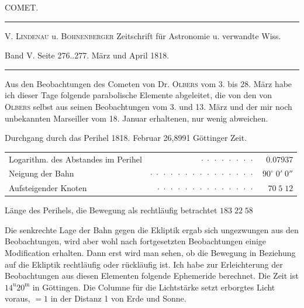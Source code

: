 \clearpage{}\hypertarget{native-407-part-lower}{}\label{native-407-part-lower}
\begin{center}\large COMET.\end{center}
\begin{center}\hrule\vspace{4pt}\fontsize{10}{12}\selectfont V. \textsc{Lindenau} u. \textsc{Bohnenberger} Zeitschrift für Astronomie u. verwandte Wiss.\par Band V. Seite 276..277. März und April 1818.\par\vspace{4pt}\hrule\vspace{4pt}\end{center}
\par\indent Aus den Beobachtungen des Cometen von Dr. \textsc{Olbers} vom 3. bis 28. März
habe ich dieser Tage folgende parabolische Elemente abgeleitet, die von den von
\textsc{Olbers} selbst aus seinen Beobachtungen vom 3. und 13. März und der mir noch
unbekannten Marseiller vom 18. Januar erhaltenen, nur wenig abweichen.

\begin{center}\fontsize{10}{12}\selectfont
Durchgang durch das Perihel 1818. Februar 26,8991 Göttinger Zeit.
\par\smallskip\begin{tabular}{lrr}
Logarithm. des Abstandes im Perihel & $\cdot\;\cdot\;\cdot\;\cdot\;\cdot\;\cdot\;\cdot\;\cdot$ & $0.07937$\\
Neigung der Bahn & $\cdot\;\cdot\;\cdot\;\cdot\;\cdot\;\cdot\;\cdot\;\cdot\;\cdot\;\cdot\;\cdot\;\cdot\;\cdot\;\cdot\;\cdot$ & $90^\circ\;0'\;0''$\\
Aufsteigender Knoten & $\cdot\;\cdot\;\cdot\;\cdot\;\cdot\;\cdot\;\cdot\;\cdot\;\cdot\;\cdot\;\cdot\;\cdot\;\cdot\;\cdot$ & $70\;5\;12$\\
\end{tabular}
\par\smallskip Länge des Perihels, die Bewegung als rechtläufig betrachtet $183\;22\;58$
\end{center}
\par\indent Die senkrechte Lage der Bahn gegen die Ekliptik ergab sich ungezwungen aus den
Beobachtungen, wird aber wohl nach fortgesetzten Beobachtungen einige
Modification erhalten. Dann erst wird man sehen, ob die Bewegung in Beziehung
auf die Ekliptik rechtläufig oder rückläufig ist. Ich habe zur Erleichterung
der Beobachtungen aus diesen Elementen folgende Ephemeride berechnet. Die
Zeit ist $14^{\mathrm u}20^{\mathrm m}$ in Göttingen. Die Columne für die
Lichtstärke setzt erborgtes Licht voraus, $=1$ in der Distanz 1 von Erde und
Sonne.

